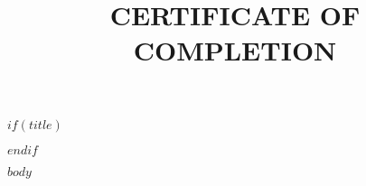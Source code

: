 \documentclass[$if(fontsize)$$fontsize$,$endif$$if(lang)$$babel-lang$,$endif$$if(papersize)$$papersize$paper,$endif$$for(classoption)$$classoption$$sep$,$endfor$]{$documentclass$}
\title{CERTIFICATE OF COMPLETION}
\author{}
\date{}
\begin{document}
$if(title)$
\maketitle
$endif$

$body$
\end{document}
